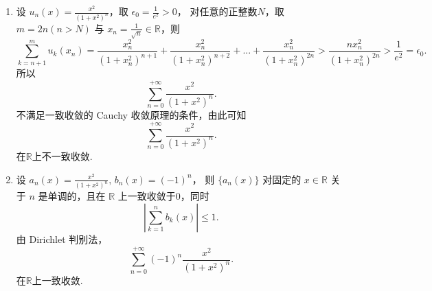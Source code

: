 \begin{enumerate}
\begin{solution}
\begin{enumerate}
        \item 
        设 $\displaystyle u_n(x)=\frac{x^2}{(1+x^2)^n}$，取 $\epsilon_0=\frac{1}{e^2}>0$，
        对任意的正整数$N$，取 $m=2n(n>N)$ 与 $\displaystyle x_n=\frac{1}{\sqrt{n}}\in\mathbb{R}$，则
        \[
        \sum_{k=n+1}^{m}u_k(x_n)=\frac{x_n^2}{(1+x_n^2)^{n+1}}+\frac{x_n^2}{(1+x_n^2)^{n+2}}+...+\frac{x_n^2}{(1+x_n^2)^{2n}}>\frac{nx_n^2}{(1+x_n^2)^{2n}}>\frac{1}{e^2}=\epsilon_0.
        \]
        所以
        \[
        \sum_{n=0}^{+\infty}\frac{x^2}{(1+x^2)^n}.
        \]
        不满足一致收敛的 Cauchy 收敛原理的条件，由此可知
        \[
        \sum_{n=0}^{+\infty}\frac{x^2}{(1+x^2)^n}.
        \]
        在$\mathbb{R}$上不一致收敛.

        \item 设 $\displaystyle a_n(x)=\frac{x^2}{(1+x^2)^n},\,b_n(x)=(-1)^n$，
        则 $\{a_n(x)\}$ 对固定的 $x\in\mathbb{R}$ 关于 $n$ 是单调的，且在 $\mathbb{R}$ 上一致收敛于0，同时
        \[
        \left|\sum_{k=1}^{n}b_k(x)\right|\leq 1.
        \]
        由 Dirichlet 判别法，
        \[
        \sum_{n=0}^{+\infty}(-1)^n\frac{x^2}{(1+x^2)^n}.
        \]
        在$\mathbb{R}$上一致收敛.
        \end{enumerate} 
    \end{solution}
\end{enumerate}

